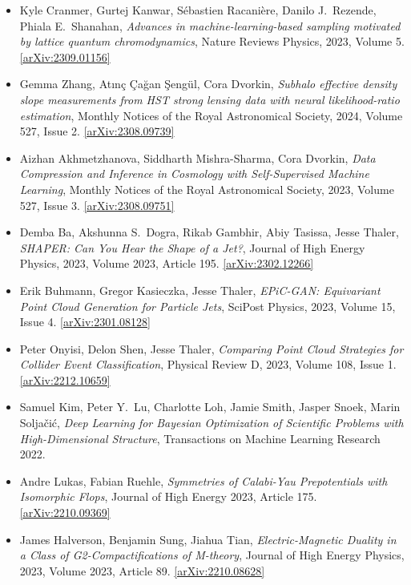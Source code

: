 \begin{itemize}
\item Kyle Cranmer, Gurtej Kanwar, Sébastien Racanière, Danilo J.\  Rezende, Phiala E.\  Shanahan, \textit{Advances in machine-learning-based sampling motivated by lattice quantum chromodynamics}, Nature Reviews Physics, 2023, Volume 5. \href{https://arxiv.org/abs/2309.01156}{[arXiv:2309.01156]} 
\item Gemma Zhang, Atınç Çağan Şengül, Cora Dvorkin, \textit{Subhalo effective density slope measurements from HST strong lensing data with neural likelihood-ratio estimation}, Monthly Notices of the Royal Astronomical Society, 2024, Volume 527, Issue 2. \href{https://arxiv.org/abs/2308.09739}{[arXiv:2308.09739]} 
\item Aizhan Akhmetzhanova, Siddharth Mishra-Sharma, Cora Dvorkin, \textit{Data Compression and Inference in Cosmology with Self-Supervised Machine Learning}, Monthly Notices of the Royal Astronomical Society, 2023, Volume 527, Issue 3. \href{https://arxiv.org/abs/2308.09751}{[arXiv:2308.09751]} 
\item Demba Ba, Akshunna S.\  Dogra, Rikab Gambhir, Abiy Tasissa, Jesse Thaler, \textit{SHAPER: Can You Hear the Shape of a Jet?}, Journal of High Energy Physics, 2023, Volume 2023, Article 195. \href{https://arxiv.org/abs/2302.12266}{[arXiv:2302.12266]} 
\item Erik Buhmann, Gregor Kasieczka, Jesse Thaler, \textit{EPiC-GAN: Equivariant Point Cloud Generation for Particle Jets}, SciPost Physics, 2023, Volume 15, Issue 4. \href{https://arxiv.org/abs/2301.08128}{[arXiv:2301.08128]} 
\item Peter Onyisi, Delon Shen, Jesse Thaler, \textit{Comparing Point Cloud Strategies for Collider Event Classification}, Physical Review D, 2023, Volume 108, Issue 1. \href{https://arxiv.org/abs/2212.10659}{[arXiv:2212.10659]} 
\item Samuel Kim, Peter Y.\  Lu, Charlotte Loh, Jamie Smith, Jasper Snoek, Marin Soljačić, \textit{Deep Learning for Bayesian Optimization of Scientific Problems with High-Dimensional Structure}, Transactions on Machine Learning Research 2022. 
\item Andre Lukas, Fabian Ruehle, \textit{Symmetries of Calabi-Yau Prepotentials with Isomorphic Flops}, Journal of High Energy 2023, Article 175. \href{https://arxiv.org/abs/2210.09369}{[arXiv:2210.09369]} 
\item James Halverson, Benjamin Sung, Jiahua Tian, \textit{Electric-Magnetic Duality in a Class of G2-Compactifications of M-theory}, Journal of High Energy Physics, 2023, Volume 2023, Article 89. \href{https://arxiv.org/abs/2210.08628}{[arXiv:2210.08628]} 

\end{itemize}
